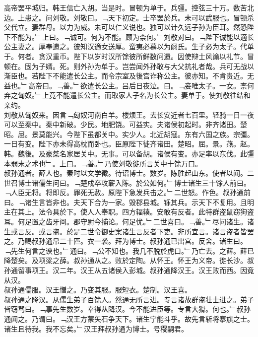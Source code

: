 \documentclass{zhvt-classic}
\begin{document}
\hspace*{2em}高帝罢平城归。韩王信亡入胡。当是时。冒顿为单于。兵彊。控弦三十万。数苦北边。上患之。问刘敬。刘敬曰。﹁天下初定。士卒罢於兵。未可以武服也。冒顿杀父代立。妻群母。以力为威。未可以仁义说也。独可以计久远子孙为臣耳。然恐陛下不能为。﹂上曰。﹁诚可。何为不能。顾为柰何。﹂刘敬对曰。﹁陛下诚能以適长公主妻之。厚奉遗之。彼知汉適女送厚。蛮夷必慕以为阏氏。生子必为太子。代单于。何者。贪汉重币。陛下以岁时汉所馀彼所鲜数问遗。因使辩士风谕以礼节。冒顿在。固为子婿。死。则外孙为单于。岂尝闻外孙敢与大父抗礼者哉。兵可无战以渐臣也。若陛下不能遣长公主。而令宗室及後宫诈称公主。彼亦知。不肯贵近。无益也。﹂高帝曰。﹁善。﹂欲遣长公主。吕后日夜泣。曰。﹁妾唯太子。一女。柰何弃之匈奴。﹂上竟不能遣长公主。而取家人子名为长公主。妻单于。使刘敬往结和亲约。\\
\hspace*{2em}刘敬从匈奴来。因言﹁匈奴河南白羊。楼烦王。去长安近者七百里。轻骑一日一夜可以至秦中。秦中新破。少民。地肥饶。可益实。夫诸侯初起时。非齐诸田。楚昭。屈。景莫能兴。今陛下虽都关中。实少人。北近胡寇。东有六国之族。宗彊。一日有变。陛下亦未得高枕而卧也。臣原陛下徙齐诸田。楚昭。屈。景。燕。赵。韩。魏後。及豪桀名家居关中。无事。可以备胡。诸侯有变。亦足率以东伐。此彊本弱末之术也﹂。上曰。﹁善。﹂乃使刘敬徙所言关中十馀万口。\\
\hspace*{2em}叔孙通者。薛人也。秦时以文学徵。待诏博士。数岁。陈胜起山东。使者以闻。二世召博士诸儒生问曰。﹁楚戍卒攻蕲入陈。於公如何。﹂博士诸生三十馀人前曰。﹁人臣无将。将即反。罪死无赦。原陛下急发兵击之。﹂二世怒。作色。叔孙通前曰。﹁诸生言皆非也。夫天下合为一家。毁郡县城。铄其兵。示天下不复用。且明主在其上。法令具於下。使人人奉职。四方辐辏。安敢有反者。此特群盗鼠窃狗盗耳。何足置之齿牙间。郡守尉今捕论。何足忧。﹂二世喜曰。﹁善。﹂尽问诸生。诸生或言反。或言盗。於是二世令御史案诸生言反者下吏。非所宜言。诸言盗者皆罢之。乃赐叔孙通帛二十匹。衣一袭。拜为博士。叔孙通已出宫。反舍。诸生曰。﹁先生何言之谀也。﹂通曰。﹁公不知也。我几不脱於虎口。﹂乃亡去。之薛。薛已降楚矣。及项梁之薛。叔孙通从之。败於定陶。从怀王。怀王为义帝。徙长沙。叔孙通留事项王。汉二年。汉王从五诸侯入彭城。叔孙通降汉王。汉王败而西。因竟从汉。\\
\hspace*{2em}叔孙通儒服。汉王憎之。乃变其服。服短衣。楚制。汉王喜。\\
\hspace*{2em}叔孙通之降汉。从儒生弟子百馀人。然通无所言进。专言诸故群盗壮士进之。弟子皆窃骂曰。﹁事先生数岁。幸得从降汉。今不能进臣等。专言大猾。何也。﹂叔孙通闻之。乃谓曰。﹁汉王方蒙矢石争天下。诸生宁能斗乎。故先言斩将搴旗之士。诸生且待我。我不忘矣。﹂汉王拜叔孙通为博士。号稷嗣君。\\
\end{document}
